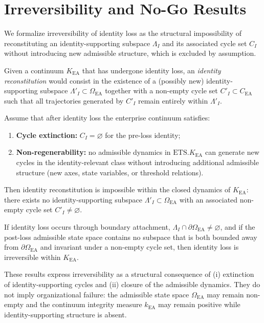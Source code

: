 ﻿\section{Irreversibility and No-Go Results}

We formalize irreversibility of identity loss as the structural impossibility of
reconstituting an identity-supporting subspace $\Lambda_I$ and its associated
cycle set $C_I$ without introducing new admissible structure, which is excluded
by assumption.

\begin{definition}
Given a continuum $K_{\mathrm{EA}}$ that has undergone identity loss, an
\emph{identity reconstitution} would consist in the existence of a (possibly
new) identity-supporting subspace
$\Lambda'_I \subset \Omega_{\mathrm{EA}}$ together with a non-empty cycle set
$C'_I \subset C_{\mathrm{EA}}$ such that all trajectories generated by $C'_I$
remain entirely within $\Lambda'_I$.
\end{definition}

\begin{theorem}
Assume that after identity loss the enterprise continuum satisfies:
\begin{enumerate}
  \item \textbf{Cycle extinction:} $C_I = \varnothing$ for the pre-loss identity;
  \item \textbf{Non-regenerability:} no admissible dynamics in
        $\mathrm{ETS}.K_{\mathrm{EA}}$ can generate new cycles in the
        identity-relevant class without introducing additional admissible
        structure (new axes, state variables, or threshold relations).
\end{enumerate}
Then identity reconstitution is impossible within the closed dynamics of
$K_{\mathrm{EA}}$: there exists no identity-supporting subspace
$\Lambda'_I \subset \Omega_{\mathrm{EA}}$ with an associated non-empty cycle set
$C'_I \neq \varnothing$.
\end{theorem}

\begin{proposition}
If identity loss occurs through boundary attachment,
$\Lambda_I \cap \partial\Omega_{\mathrm{EA}} \neq \varnothing$, and if the
post-loss admissible state space contains no subspace that is both bounded away
from $\partial\Omega_{\mathrm{EA}}$ and invariant under a non-empty cycle set,
then identity loss is irreversible within $K_{\mathrm{EA}}$.
\end{proposition}

These results express irreversibility as a structural consequence of
(i) extinction of identity-supporting cycles and
(ii) closure of the admissible dynamics. They do not imply organizational
failure: the admissible state space $\Omega_{\mathrm{EA}}$ may remain non-empty
and the continuum integrity measure $k_{\mathrm{EA}}$ may remain positive while
identity-supporting structure is absent.
